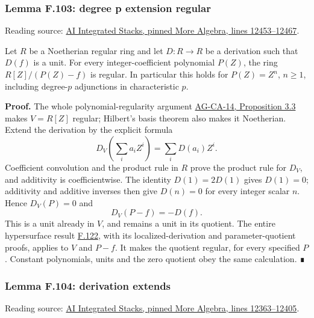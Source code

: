 \documentclass[11pt,a4paper,openany]{report}
\begin{document}
\subsubsection{Lemma F.103: degree p extension regular}\label{AG-RG-S05-lemma-f.103-degree-p-extension-regular}

Reading source: \href{https://github.com/KokunoYumeto/unofficial-stacks-project-ai-drafts/blob/565b10e987aba5969b21145a0833f42d69f96790/more-algebra.tex\#L12453-L12467}{AI Integrated Stacks, pinned More Algebra, lines 12453--12467}.

Let \(R\) be a Noetherian regular ring and let \(D:R\to R\) be a derivation such that \(D(f)\) is a unit. For every integer-coefficient polynomial \(P(Z)\), the ring \(R[Z]/(P(Z)-f)\) is regular. In particular this holds for \(P(Z)=Z^n\), \(n\ge1\), including degree-\(p\) adjunctions in characteristic \(p\).

\textbf{Proof.} The whole polynomial-regularity argument \href{https://github.com/KokunoYumeto/open-math-courses/blob/d02d0a3669f42579db037cd44de1d113fdd770a1/docs/courses/AG-CA/src/regular-local-rings.md}{AG-CA-14, Proposition 3.3} makes \(V=R[Z]\) regular; Hilbert's basis theorem also makes it Noetherian. Extend the derivation by the explicit formula \[D_V\!\left(\sum_i a_iZ^i\right)=\sum_i D(a_i)Z^i.\] Coefficient convolution and the product rule in \(R\) prove the product rule for \(D_V\), and additivity is coefficientwise. The identity \(D(1)=2D(1)\) gives \(D(1)=0\); additivity and additive inverses then give \(D(n)=0\) for every integer scalar \(n\). Hence \(D_V(P)=0\) and \[D_V(P-f)=-D(f).\] This is a unit already in \(V\), and remains a unit in its quotient. The entire hypersurface result \hyperref[AG-RG-S05-more-algebra-lemma-quotient-regular]{F.122}, with its localized-derivation and parameter-quotient proofs, applies to \(V\) and \(P-f\). It makes the quotient regular, for every specified \(P\). Constant polynomials, units and the zero quotient obey the same calculation. ∎

\label{AG-RG-S05-more-algebra-lemma-derivation-extends}

\subsubsection{Lemma F.104: derivation extends}\label{AG-RG-S05-lemma-f.104-derivation-extends}

Reading source: \href{https://github.com/KokunoYumeto/unofficial-stacks-project-ai-drafts/blob/565b10e987aba5969b21145a0833f42d69f96790/more-algebra.tex\#L12363-L12405}{AI Integrated Stacks, pinned More Algebra, lines 12363--12405}.
\end{document}

